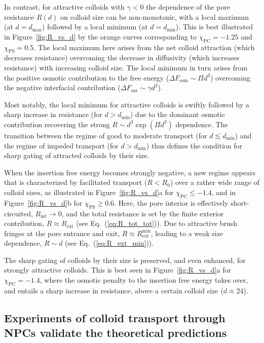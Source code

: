 \documentclass[12pt, a4paper]{article}
\begin{document}
In contrast, for attractive colloids with $\gamma <0$ the dependence of the pore resistance $R(d)$ on colloid size can be non-monotonic, with a local maximum (at $d=d_\text{max}$) followed by a local minimum (at $d=d_\text{min}$).
This is best illustrated in Figure~\ref{fig:R_vs_d} by the orange curves corresponding to $\chi_{\text{PC}} = -1.25$ and $\chi_{\text{PS}}=0.5$.
The local maximum here arises from the net colloid attraction (which decreases resistance) overcoming the decrease in diffusivity (which increases resistance) with increasing colloid size.
The local minimum in turn arises from the positive osmotic contribution to the free energy ($\Delta F_{\text{osm}} \sim \Pi d^3$) overcoming the negative interfacial contribution ($\Delta F_{\text{sur}} \sim \gamma d^2$).

Most notably, the local minimum for attractive colloids is swiftly followed by a sharp increase in resistance (for $d > d_{\text{min}}$) due to the dominant osmotic contribution recovering the strong $R \sim d^3 \exp(\Pi d^3)$ dependence.
The transition between the regime of good to moderate transport (for $d \lesssim d_{\text{min}}$) and the regime of impeded transport (for $d > d_{\text{min}}$) thus defines the condition for sharp gating of attracted colloids by their size.

When the insertion free energy becomes strongly negative, a new regime appears that is characterized by facilitated transport ($R < R_0$) over a rather wide range of colloid sizes, as illustrated in 
Figure~\ref{fig:R_vs_d}a for $\chi_{\text{PC}} \le -1.4$, and in Figure~\ref{fig:R_vs_d}b for $\chi_{\text{PS}} \ge 0.6$.
Here, the pore interior is effectively short-circuited, $R_{\text{int}} \to 0$, and the total resistance is set by the finite exterior contribution, $R \approx R_{\text{ext}}$ (see Eq.~(\ref{eq:R_tot_tot})).
Due to attractive brush fringes at the pore entrance and exit, $R \approx R_{\text{ext}}^{\text{min}}$, leading to a weak size dependence, $R \sim d$ (see Eq.~(\ref{eq:R_ext_min})).

The sharp gating of colloids by their size is preserved, and even enhanced, for strongly attractive colloids.
This is best seen in Figure~\ref{fig:R_vs_d}a for $\chi_\text{PC}= -1.4$, where the osmotic penalty to the insertion free energy takes over, and entails a sharp increase in resistance, above a certain colloid size ($d \approx 24$).


\subsection{Experiments of colloid transport through NPCs validate the theoretical predictions}
\end{document}
